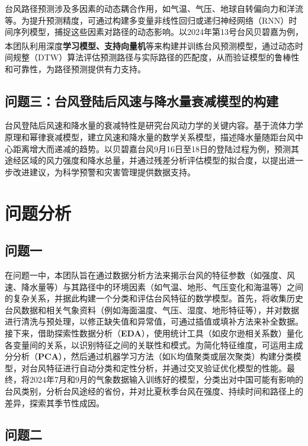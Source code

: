 \documentclass[withoutpreface,bwprint]{cumcmthesis}
\begin{document}
台风路径预测涉及多因素的动态耦合作用，如气温、气压、地球自转偏向力和洋流等。为提升预测精度，可通过构建多变量非线性回归或递归神经网络（RNN）时间序列模型，捕捉这些因素对路径的动态影响。以2024年第13号台风贝碧嘉为例，本团队利用深度\textbf{学习模型、支持向量机}等来构建并训练台风预测模型\textsuperscript{\cite{陈睿2018基于深度学习的台风预测关键技术研究}}，通过动态时间规整（DTW）算法评估预测路径与实际路径的匹配度，从而验证模型的鲁棒性和可靠性，为路径预测提供有力支持。

\subsection{问题三：台风登陆后风速与降水量衰减模型的构建}

台风登陆后风速和降水量的衰减特性是研究台风动力学的关键内容。基于流体力学原理和幂律衰减模型，建立风速和降水量的数学关系模型，描述降水量随距台风中心距离增大而递减的趋势。以贝碧嘉台风9月16日至18日的登陆过程为例，预测其途经区域的风力强度和降水总量，并通过残差分析评估模型的拟合度，以提出进一步改进建议，为科学预警和灾害管理提供数据支持。


\newpage
\section{问题分析}

\subsection{问题一}

在问题一中，本团队旨在通过数据分析方法来揭示台风的特征参数（如强度、风速、降水量等）与其路径中的环境因素（如气温、地形、气压变化和海温等）之间的复杂关系，并据此构建一个分类和评估台风特征的数学模型。首先，将收集历史台风数据和相关气象资料（例如海面温度、气压、湿度、地形特征等），并对数据进行清洗与预处理，以修正缺失值和异常值，可通过插值或填补方法来补全数据。接下来，借助探索性数据分析（\textbf{EDA}），使用统计工具（如皮尔逊相关系数）量化各变量间的关系，以识别特征之间的关联性和模式。为简化特征维度，可运用主成分分析（\textbf{PCA}），然后通过机器学习方法（如K均值聚类或层次聚类）构建分类模型，对台风特征进行自动分类和定性分析，并通过交叉验证优化模型的性能。最终，将2024年7月和9月的气象数据输入训练好的模型，分类出对中国可能有影响的台风类别，分析台风途经的省份，并对比夏秋季台风在强度、持续时间和路径上的差异，探索其季节性成因。

\subsection{问题二}
\end{document}

